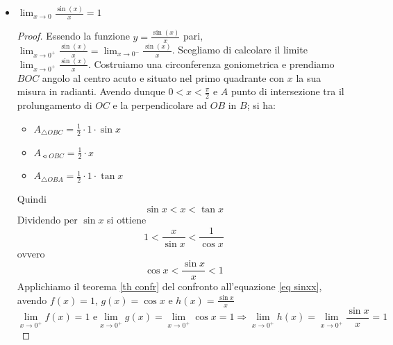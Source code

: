 \documentclass[]{report}
\theoremstyle{definition}
\theoremstyle{remark}
\theoremstyle{plain}
\numberwithin{equation}{chapter}
\begin{document}
\begin{itemize}
	\item $\displaystyle \lim_{x \to 0} \frac{\sin(x)}{x} = 1$
	\begin{proof}
	Essendo la funzione $y=\frac{\sin(x)}{x}$ pari, $\lim_{x \to 0^+} \frac{\sin(x)}{x}=\lim_{x \to 0^-} \frac{\sin(x)}{x}$. Scegliamo di calcolare il limite $\lim_{x \to 0^+} \frac{\sin(x)}{x}$.
	Costruiamo una circonferenza goniometrica e prendiamo $BOC$ angolo al centro acuto e situato nel primo quadrante con $x$ la sua misura in radianti. Avendo dunque $0<x<\frac{\pi}{2}$ e $A$ punto di intersezione tra il prolungamento di $OC$ e la perpendicolare ad $OB$ in $B$; si ha:
	\begin{itemize}
		\item $A_{\triangle OBC}=\frac{1}{2} \cdot 1 \cdot \sin x$
		\item $A_{\leftslice OBC}=\frac{1}{2} \cdot x$
		\item $A_{\triangle OBA}=\frac{1}{2} \cdot 1 \cdot \tan x$
	\end{itemize}
	Quindi
	$$\sin x<x<\tan x$$
	Dividendo per $\sin x$ si ottiene
	$$1<\frac{x}{\sin x}<\frac{1}{\cos x}$$
	ovvero
	\begin{equation}\label{eq sinxx}
		\cos x<\frac{\sin x}{x}< 1
	\end{equation}
	Applichiamo il teorema \ref{th confr} del confronto all'equazione \eqref{eq 
	sinxx}, avendo $f(x)=1$, $g(x)=\cos x$ e $h(x)=\frac{\sin x}{x}$ 
	$$\lim_{x \to 0^+} f(x)=1 \textrm{ e} \lim_{x \to 0^+} g(x)=\lim_{x \to 0^+} \cos x=1 \Rightarrow \lim_{x \to 0^+} h(x)=\lim_{x \to 0^+} \frac{\sin x}{x}=1$$


\end{proof}
\end{itemize}
\end{document}
